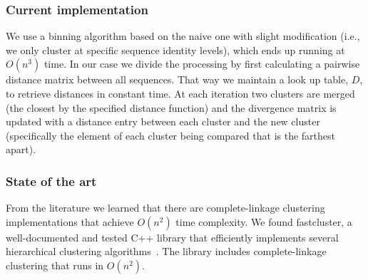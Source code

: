 \subsubsection*{Current implementation}
We use a binning algorithm based on the naive one
with slight modification (i.e., we only cluster at specific sequence identity levels), which ends up running at $O(n^3)$ time. %
In our case we divide the processing by first calculating a pairwise distance matrix between all sequences.
That way we maintain a look up table, $D$, to retrieve distances in constant time.
At each iteration two clusters are merged (the closest by the specified distance function) and the divergence matrix is updated with a distance entry between each cluster and the new cluster (specifically the element of each cluster being compared that is the farthest apart).

\subsubsection*{State of the art}
From the literature we learned that there are complete-linkage clustering implementations that achieve $O(n^2)$ time complexity.
We found fastcluster, a well-documented and tested C++ library that efficiently implements several hierarchical clustering algorithms~\cite{mullner2011modern, FastClust}.
The library includes complete-linkage clustering that runs in $O(n^2)$.

